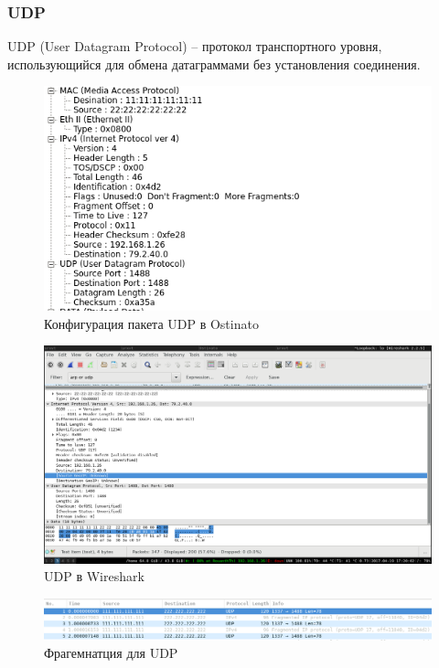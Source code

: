 \documentclass[12pt, a4paper] {ncc}
\begin{document}
\subsubsection*{UDP}
	UDP (User Datagram Protocol) -- протокол транспортного уровня, использующийся для обмена датаграммами
без установления соединения.

	\begin{figure}[h!]
		\includegraphics[scale=0.5]{UDPStream_without_frag.png}
		\caption{Конфигурация пакета UDP в Ostinato}
		\center
	\end{figure}

	\begin{figure}[h!]
		\includegraphics[scale=0.4]{./CapturedUDP.png}
		\caption{UDP в Wireshark}
		\center
	\end{figure}

	\begin{figure}[h!]
		\includegraphics[scale=0.4]{./UDPFrag.png}
		\caption{Фрагемнатция для UDP}
		\center
	\end{figure}
\end{document}
